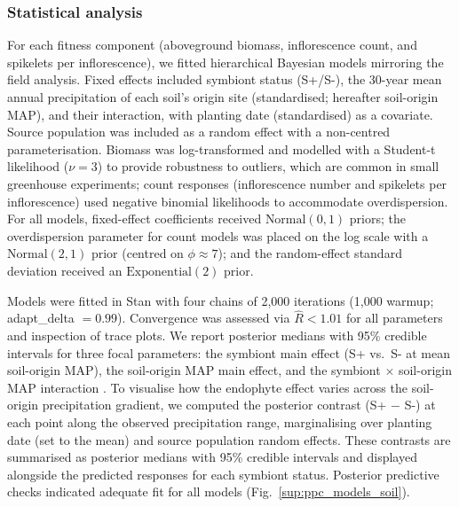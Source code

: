 \documentclass[12pt]{article}\usepackage[]{graphicx}\usepackage[dvipsnames]{xcolor}
\begin{document}
\subsubsection {Statistical analysis}
{}
\label{sec:greenhouse_models}
For each fitness component (aboveground biomass, inflorescence count, and spikelets per inflorescence), we fitted hierarchical Bayesian models mirroring the field analysis. Fixed effects included symbiont status 
(S+/S-), the 30-year mean annual precipitation of each soil's origin site (standardised; hereafter soil-origin MAP), and their interaction, with planting date (standardised) as a covariate. 
Source population was included as a random effect with a non-centred parameterisation. 
Biomass was log-transformed and modelled with a Student-t likelihood ($\nu = 3$) to provide robustness to outliers, which are common in small greenhouse experiments; count responses (inflorescence number and spikelets 
per inflorescence) used negative binomial likelihoods to accommodate overdispersion. 
For all models, fixed-effect coefficients received $\text{Normal}(0, 1)$ priors; the overdispersion parameter for count models was placed on the log scale with a $\text{Normal}(2, 1)$ prior (centred on $\phi \approx 7$); and the random-effect standard deviation received an $\text{Exponential}(2)$ prior.

Models were fitted in Stan \citep{Rstan} with four chains of 2,000 iterations (1,000 warmup; adapt\_delta $= 0.99$). Convergence was assessed via $\hat{R} < 1.01$ for all parameters and inspection of trace plots.
We report posterior medians with 95\% credible intervals for three focal parameters: the symbiont main effect (S+ vs.\ S- at mean soil-origin MAP), the soil-origin MAP main effect, and the symbiont $\times$ soil-origin MAP interaction . 
To visualise how the endophyte effect varies across the soil-origin precipitation gradient, we computed the posterior contrast (S+ $-$ S-) 
at each point along the observed precipitation range, marginalising over planting date (set to the mean) and source population random effects. 
These contrasts are summarised as posterior medians with 95\% credible intervals and displayed alongside the predicted responses for each symbiont 
status. 
Posterior predictive checks indicated adequate fit for all models (Fig.~\ref{sup:ppc_models_soil}).
\clearpage
\end{document}
